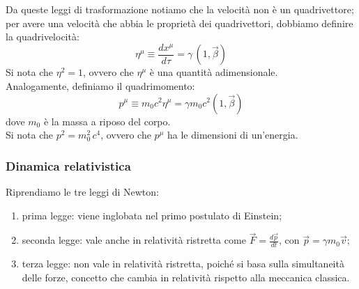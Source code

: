 Da queste leggi di trasformazione notiamo che la velocità non è un quadrivettore; per avere una velocità che abbia le proprietà dei quadrivettori, dobbiamo definire la quadrivelocità:
\begin{equation}
	\eta^{\mu} \equiv \displaystyle\frac{dx^{\mu}}{d\tau} = \gamma \, (1, \vec{\beta})
	\label{eq:16}
\end{equation}
Si nota che $ \eta^2 = 1 $, ovvero che $ \eta^{\mu} $ è una quantità adimensionale. \\ 
%
Analogamente, definiamo il quadrimomento:
\begin{equation}
	p^{\mu} \equiv m_0 c^2 \eta^{\mu} = \gamma m_0 c^2 (1, \vec{\beta})
	\label{eq:17}
\end{equation}
dove $ m_0 $ è la massa a riposo del corpo. \\ 
Si nota che $ p^2 = m_0^2 \, c^4 $, ovvero che $ p^{\mu} $ ha le dimensioni di un'energia.

\subsubsection{Dinamica relativistica}

Riprendiamo le tre leggi di Newton:
\begin{enumerate}
	\item prima legge: viene inglobata nel primo postulato di Einstein;
	\item seconda legge: vale anche in relatività ristretta come $ \vec{F} = \frac{d\vec{p}}{dt} $, con $ \vec{p} = \gamma m_0 \vec{v} $;
	\item terza legge: non vale in relatività ristretta, poiché si basa sulla simultaneità delle forze, concetto che cambia in relatività rispetto alla meccanica classica.
\end{enumerate}

